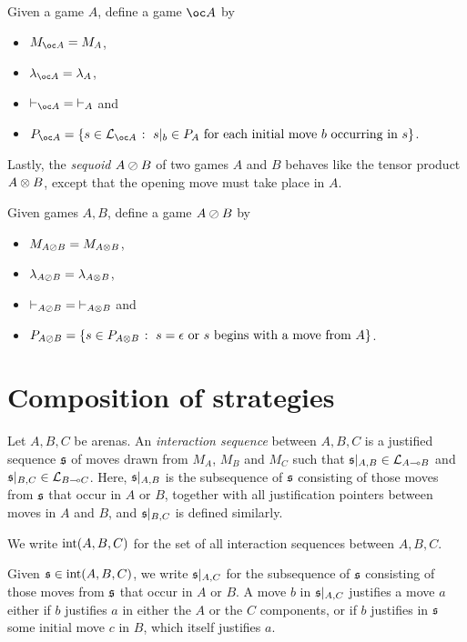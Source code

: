 \documentclass[11pt]{report}
\begin{document}
\begin{definition}
  Given a game $A$, define a game $\oc A$ by
  \begin{itemize}
    \item $M_{\oc A}=M_A$,
    \item $\lambda_{\oc A} = \lambda_A$,
    \item $\ts_{\oc A} = \ts_A$ and
    \item $P_{\oc A} = \{s\in \L_{\oc A} \suchthat \text{$s\vert_b\in P_A$ for each initial move $b$ occurring in $s$}\}$.
  \end{itemize}
\end{definition}

Lastly, the \emph{sequoid} $A\oslash B$ of two games $A$ and $B$ behaves like the tensor product $A\otimes B$, except that the opening move must take place in $A$.

\begin{definition}
  Given games $A,B$, define a game $A\oslash B$ by
  \begin{itemize}
    \item $M_{A\oslash B} = M_{A\otimes B}$, 
    \item $\lambda_{A\oslash B} = \lambda_{A\otimes B}$, 
    \item $\mathbin{\vdash}_{A\oslash B} = \mathbin{\vdash}_{A \otimes B}$ and
    \item $P_{A\oslash B} = \{s\in P_{A\otimes B}\;\colon\;\text{$s=\epsilon$ or $s$ begins with a move from $A$}\}$.
  \end{itemize}
\end{definition}

\section{Composition of strategies}

\begin{definition}
  Let $A,B,C$ be arenas.  
  An \emph{interaction sequence} between $A,B,C$ is a justified sequence $\mathfrak s$ of moves drawn from $M_A$, $M_B$ and $M_C$ such that $\mathfrak s\vert_{A,B}\in \mathcal L_{A\multimap B}$ and $\mathfrak s\vert_{B,C}\in \mathcal L_{B\multimap C}$.  
  Here, $\mathfrak s\vert_{A,B}$ is the subsequence of $\mathfrak s$ consisting of those moves from $\mathfrak s$ that occur in $A$ or $B$, together with all justification pointers between moves in $A$ and $B$, and $\mathfrak s\vert_{B,C}$ is defined similarly.

  We write $\operatorname{int}(A,B,C)$ for the set of all interaction sequences between $A,B,C$.

  Given $\mathfrak s\in\operatorname{int}(A,B,C)$, we write $\mathfrak s\vert_{A,C}$ for the subsequence of $\mathfrak s$ consisting of those moves from $\mathfrak s$ that occur in $A$ or $B$.  
  A move $b$ in $\mathfrak s\vert_{A,C}$ justifies a move $a$ either if $b$ justifies $a$ in either the $A$ or the $C$ components, or if $b$ justifies in $\mathfrak s$ some initial move $c$ in $B$, which itself justifies $a$.
\end{definition}
\end{document}

